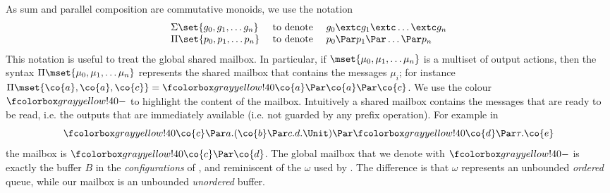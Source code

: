 As sum and parallel composition are commutative monoids, we
use the notation
$$
\begin{array}{lll}
  \Sigma \set{g_0, g_1, \ldots g_n} &\text{ to denote }&g_0 \extc g_1 \extc \ldots \extc g_n \\
  \Pi \set{p_0, p_1, \ldots p_n}&\text{ to denote }&p_0 \Par p_1 \Par \ldots \Par p_n
\end{array}
$$
This notation is useful to treat the global shared mailbox.
In particular, if $\mset{ \mu_0, \mu_1, \ldots \mu_n} $
is a multiset of output actions, then the syntax $\Pi  \mset{ \mu_0,
  \mu_1, \ldots \mu_n} $ represents the shared mailbox that contains
the messages $\mu_i$; for instance $\Pi \mset{ \co{a}, \co{a}, \co{c}
} = \mailbox{ \co{ a  } \Par \co{ a } \Par \co{c}}$.
We use the colour $\mailbox{ - }$ to highlight the content of the mailbox.
Intuitively a shared mailbox contains the messages
that are ready to be read, i.e. the outputs %
that are immediately available (i.e. not guarded by any prefix operation).
For example in
$$
\mailbox{\co{c}} \Par a.(\co{b} \Par c.d.\Unit) \Par \mailbox{\co{d}} \Par \tau.\co{e}
$$
the mailbox is $\mailbox{\co{c} \Par \co{d}}$.
The global mailbox that we denote with $\mailbox{ - }$ is exactly the
  buffer $B$ in the {\em configurations} of
  \cite{DBLP:phd/us/Thati03}, and reminiscent of the $\omega$ used by
  \cite{DBLP:conf/fossacs/BravettiLZ21}. The difference is that $\omega$
  represents an unbounded {\em ordered} queue, while our mailbox is
  an unbounded {\em unordered} buffer.




